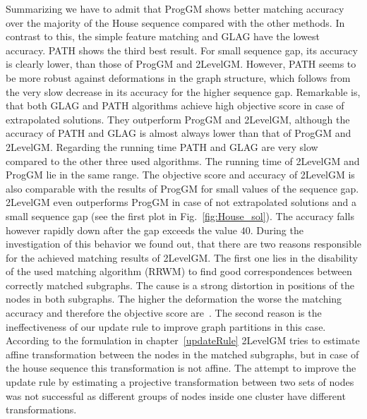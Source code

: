 Summarizing we have to admit that ProgGM shows better matching accuracy over the majority of the House sequence compared with the other methods. In contrast to this, the simple feature matching and GLAG have the lowest accuracy. PATH shows the third best result. For small sequence gap, its accuracy is clearly lower, than those of ProgGM and 2LevelGM. However, PATH seems to be more robust against deformations in the graph structure, which follows from the very slow decrease in its accuracy for the higher sequence gap. Remarkable is, that both GLAG and PATH algorithms achieve high objective score in case of extrapolated solutions. They outperform ProgGM and 2LevelGM, although the accuracy of PATH and GLAG is almost always lower than that of ProgGM and 2LevelGM. Regarding the running time PATH and GLAG are very slow compared to the other three used algorithms. The running time of 2LevelGM and ProgGM lie in the same range. The objective score and accuracy of 2LevelGM is also comparable with the results of ProgGM for small values of the sequence gap. 2LevelGM even outperforms ProgGM in case of not extrapolated solutions and a small sequence gap (see the first plot in Fig.~\ref{fig:House_sol}). The accuracy falls however rapidly down after the gap exceeds the value $40$. During the investigation of this behavior we found out, that there are two reasons responsible for the achieved matching results of 2LevelGM. The first one lies in the disability of the used matching algorithm (RRWM) to find good correspondences between correctly matched subgraphs. The cause is a strong distortion in positions of the nodes in both subgraphs. The higher the deformation the worse the matching accuracy and therefore the objective score are~\cite{Cho2010_RRWM}.
The second reason is the ineffectiveness of our update rule to improve graph partitions in this case. According to the formulation in chapter~\ref{updateRule} 2LevelGM tries to estimate affine transformation between the nodes in the matched subgraphs, but in case of the house sequence this transformation is not affine. The attempt to improve the update rule by estimating a projective transformation between two sets of nodes was not successful as different groups of nodes inside one cluster have different transformations.

\FloatBarrier


